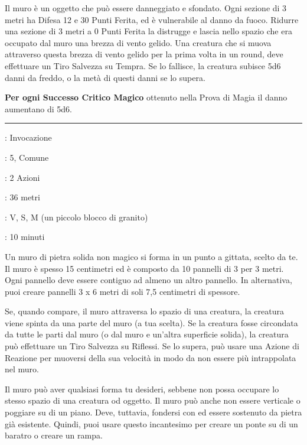 \begin{multicols}{2}
Il muro è un oggetto che può essere danneggiato e sfondato. Ogni sezione di 3 metri ha Difesa 12 e 30 Punti Ferita, ed è vulnerabile al danno da fuoco. Ridurre una sezione di 3 metri a 0 Punti Ferita la distrugge e lascia nello spazio che era occupato dal muro una brezza di vento gelido. Una creatura che si muova attraverso questa brezza di vento gelido per la prima volta in un round, deve effettuare un Tiro Salvezza su Tempra. Se lo fallisce, la creatura subisce 5d6 danni da freddo, o la metà di questi danni se lo supera.

\textbf{Per ogni Successo Critico Magico} ottenuto nella Prova di Magia il danno aumentano di 5d6.

\smallskip\noindent\rule{\linewidth}{2pt} \hypertarget{Muro di Pietra}{}\smallskip{}
\noindent
\begin{description}[noitemsep, topsep=0pt, parsep=0pt, partopsep=0pt, leftmargin=0cm, labelwidth=2.8cm]
	\item[\textbf{Lista di Magia}]: Invocazione
	\item[\textbf{Livello}]: 5, Comune
	\item[\textbf{T. di Lancio}]: 2 Azioni
	\item[\textbf{Gittata}]: 36 metri
	\item[\textbf{Componenti}]: V, S, M (un piccolo blocco di granito)
	\item[\textbf{Durata}]: 10 minuti
\end{description}

Un muro di pietra solida non magico si forma in un punto a gittata, scelto da te. Il muro è spesso 15 centimetri ed è composto da 10 pannelli di 3 per 3 metri. Ogni pannello deve essere contiguo ad almeno un altro pannello. In alternativa, puoi creare pannelli 3 x 6 metri di soli 7,5 centimetri di spessore.

Se, quando compare, il muro attraversa lo spazio di una creatura, la creatura viene spinta da una parte del muro (a tua scelta). Se la creatura fosse circondata da tutte le parti dal muro (o dal muro e un'altra superficie solida), la creatura può effettuare un Tiro Salvezza su Riflessi. Se lo supera, può usare una Azione di Reazione per muoversi della sua velocità in modo da non essere più intrappolata nel muro.

Il muro può aver qualsiasi forma tu desideri, sebbene non possa occupare lo stesso spazio di una creatura od oggetto. Il muro può anche non essere verticale o poggiare su di un piano. Deve, tuttavia, fondersi con ed essere sostenuto da pietra già esistente. Quindi, puoi usare questo incantesimo per creare un ponte su di un baratro o creare un rampa.


\end{multicols}
